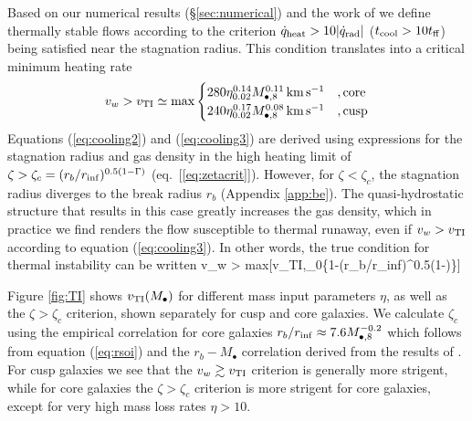 \documentclass[usenatbib,fleqn]{mn2e}
\begin{document}
Based on our numerical results (\S \ref{sec:numerical}) and the work of \citet{McCourt+12} we define thermally stable flows according to the criterion $\dot{q}_{\rm heat} > 10|\dot{q}_{\rm rad}|$ ($t_{\rm
  cool} > 10t_{\rm ff}$) being satisfied near the stagnation radius.  This condition translates into a
critical minimum heating rate
\begin{align}
v_{w} > v_{\rm TI} \simeq
  {\rm max}\begin{cases}
   280 \eta_{0.02}^{0.14} M_{\bullet,8}^{0.11}\,{\rm km\,s^{-1}}  &, \text{core}\\
   240 \eta_{0.02}^{0.17} M_{\bullet,8}^{0.08}\,{\rm km\,s^{-1}}   &, \text{cusp}  \\
  \end{cases}
  \label{eq:cooling3}
\end{align}
Equations (\ref{eq:cooling2}) and (\ref{eq:cooling3}) are derived using expressions for the stagnation radius and gas density in the high heating limit of $\zeta > \zeta_c = (r_{b}/r_{\rm inf})^{0.5(1-\Gamma)}$ (eq.~[\ref{eq:zetacrit}]).  However, for $\zeta < \zeta_c$, the stagnation radius diverges to the break radius $r_b$ (Appendix \ref{app:be}).  The quasi-hydrostatic structure that results in this case greatly increases the gas density, which in practice we find renders the flow susceptible to thermal runaway, even if $v_{w} > v_{\rm TI}$ according to equation (\ref{eq:cooling3}).  In other words, the true condition for thermal instability  can be written
\be
v_w > {\rm max}[v_{\rm TI},\sigma_0\{1-(r_{b}/r_{\rm inf})^{0.5(1-\Gamma)}\}]
\ee

Figure \ref{fig:TI} shows $v_{\rm TI}(M_{\bullet})$ for different mass input parameters $\eta$, as well as the $\zeta > \zeta_c$ criterion, shown separately for cusp and core galaxies.  We calculate $\zeta_c$ using the empirical correlation for
core galaxies $r_{b}/r_{\rm inf} \approx 7.6M_{\bullet,8}^{-0.2}$ which
follows from equation (\ref{eq:rsoi}) and the $r_b-M_{\bullet}$
correlation derived from the results of \citet{LauerFaber+:2007a}.
For cusp galaxies we see that the $v_w \gtrsim v_{\rm TI}$ criterion is generally more strigent, while for core galaxies the $\zeta > \zeta_c$ criterion is more strigent for core galaxies, except for very high mass loss rates $\eta > 10$.
\end{document}
